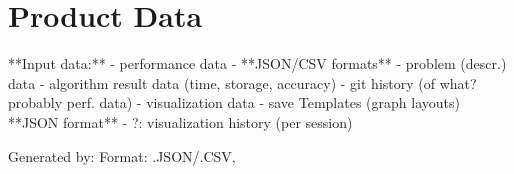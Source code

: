 \section{Product Data}

**Input data:**
- performance data
    - **JSON/CSV formats**
    - problem (descr.) data
    - algorithm result data (time, storage, accuracy)
- git history (of what? probably perf. data)
- visualization data
    - save Templates (graph layouts) **JSON format**
    - ?: visualization history (per session)
    
Generated by: 
Format: .JSON/.CSV, 


